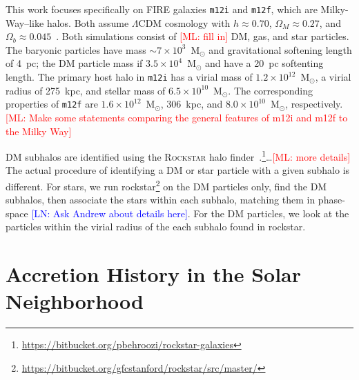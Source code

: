 \documentclass[twocolumn,preprintnumbers]{aastex6}
\newcommand{\FeH}{\text{[Fe/H]} }
\def\ML#1{\textcolor{red}{[ML: #1]}}
\def\lmn#1{\textcolor{blue}{[LN: #1]}}
\begin{document}
This work focuses specifically on \textsc{FIRE} galaxies \texttt{m12i} and \texttt{m12f}, which are Milky-Way--like halos.   Both assume $\Lambda$CDM cosmology with $h\approx 0.70$, $\Omega_M \approx 0.27$, and $\Omega_b \approx 0.045$~\citep{Ade:2013zuv}.  Both simulations consist of \ML{fill in} DM, gas, and star particles.  The baryonic particles have mass $\sim 7\times10^{3}$~M$_\odot$ and gravitational softening length of 4~pc; the DM particle mass if $3.5 \times10^4$~M$_\odot$ and have a 20~pc softenting length.  The primary host halo in \texttt{m12i} has a virial mass of $1.2\times10^{12}$~M$_\odot$, a virial radius of 275~kpc, and stellar mass of $6.5\times10^{10}$~M$_\odot$.  
The corresponding properties of \texttt{m12f} are $1.6\times10^{12}$~M$_\odot$, 306~kpc, and $8.0\times10^{10}$~M$_\odot$, respectively. 
\ML{Make some statements comparing the general features of m12i and m12f to the Milky Way}

DM subhalos are identified using the \textsc{Rockstar} halo finder~\citep{Behroozi:2011ju}.\footnote{\url{https://bitbucket.org/pbehroozi/rockstar-galaxies}}\ldots \ML{more details}
%
The actual procedure of identifying a DM or star particle with a given subhalo is different.  For stars, we run rockstar\footnote{\url{https://bitbucket.org/gfcstanford/rockstar/src/master/}} \citep{2013ApJ...762..109B} on the DM particles only, find the DM subhalos, then associate the stars within each subhalo, matching them in phase-space \lmn{Ask Andrew about details here}. For the DM particles, we look at the particles within the virial radius of the each subhalo found in rockstar.  




%



\section{Accretion History in the Solar Neighborhood}
\label{sec:origins}
\end{document}
